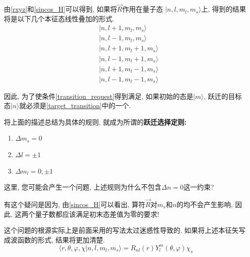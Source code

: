 \documentclass[a4paper, 11pt]{article}
\begin{document}
\begin{spacing}{1.2}
          由\eqref{rxyz}和\eqref{sincos_H}可以得到, 如果将$\vec{R}$作用在量子态
          $|n,l,m_l,m_s\rangle$上, 得到的结果将是以下几个本征态线性叠加的形式.
          \begin{equation}
            \label{target_transition}
            \begin{aligned}
              &|n,l+1,m_l,m_s\rangle\\
              &|n,l-1,m_l,m_s\rangle\\
              &|n,l+1,m_l+1,m_s\rangle\\
              &|n,l-1,m_l+1,m_s\rangle\\
              &|n,l+1,m_l-1,m_s\rangle\\
              &|n,l-1,m_l-1,m_s\rangle
            \end{aligned}
          \end{equation}

          因此, 为了使条件\eqref{transition_request}得到满足, 如果初始的态是$|m\rangle$, 
          跃迁的目标态$|n\rangle$就必须是\eqref{target_transition}中的一个.
          
          将上面的描述总结为具体的规则, 就成为所谓的\textbf{跃迁选择定则:}

          \begin{enumerate}[*]
            \centering
            \item $\Delta{}m_s = 0$
            \item $\Delta{}l = \pm1$ 
            \item $\Delta{}m_l = 0, \pm1$
          \end{enumerate}
          
          这里, 您可能会产生一个问题, 上述规则为什么不包含$\Delta{}n = 0$这一约束?

          有这个疑问是因为, 由\eqref{sincos_H}可以看出, 算符$\vec{R}$对$m_s$和$n$的均不会产生影响, 
          因此, 这两个量子数都应该满足初末态差值为零的要求!

          这个问题的根源实际上是前面采用的写法太过迷惑性导致的. 如果将上述本征矢写成波函数的形式, 结果将更加清楚.
          \begin{equation}
            \langle{}r,\theta,\varphi,\chi|n,l,m_l,m_s\rangle = R_{nl}(r)Y_l^m(\theta,\varphi)\chi_s
          \end{equation}


\end{spacing}
\end{document}
